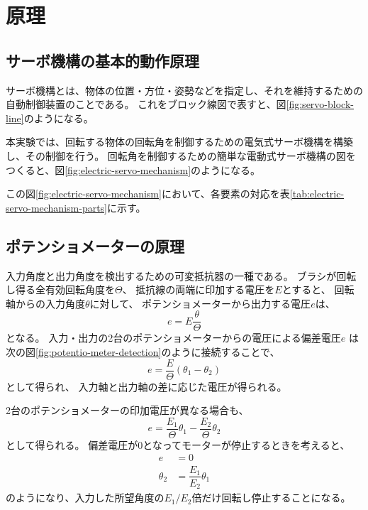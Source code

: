 \documentclass[../../../main]{subfiles}
\begin{document}
\section{原理}\label{sec:principle}

\subsection{サーボ機構の基本的動作原理}

サーボ機構とは、物体の位置・方位・姿勢などを指定し、それを維持するための自動制御装置のことである。
これをブロック線図で表すと、図\ref{fig:servo-block-line}のようになる。

本実験では、回転する物体の回転角を制御するための電気式サーボ機構を構築し、その制御を行う。
回転角を制御するための簡単な電動式サーボ機構の図をつくると、図\ref{fig:electric-servo-mechanism}のようになる。

この図\ref{fig:electric-servo-mechanism}において、各要素の対応を表\ref{tab:electric-servo-mechanism-parts}に示す。



\subsection{ポテンショメーターの原理}
入力角度と出力角度を検出するための可変抵抗器の一種である。
ブラシが回転し得る全有効回転角度を$\Theta$、
抵抗線の両端に印加する電圧を$E$とすると、
回転軸からの入力角度$\theta$に対して、
ポテンショメーターから出力する電圧$e$は、
\begin{equation}\label{eq:potentiometer}
    e = E \frac{\theta}{\Theta}
\end{equation}
となる。
入力・出力の2台のポテンショメーターからの電圧による偏差電圧$e$
は次の図\ref{fig:potentio-meter-detection}のように接続することで、
\begin{equation}
    e = \dfrac{E}{\Theta} (\theta_1 - \theta_2)
\end{equation}
として得られ、
入力軸と出力軸の差に応じた電圧が得られる。


2台のポテンショメーターの印加電圧が異なる場合も、
\begin{equation}
    e = \dfrac{E_1}{\Theta} \theta_1 - \dfrac{E_2}{\Theta} \theta_2
\end{equation}
として得られる。
偏差電圧が0となってモーターが停止するときを考えると、
\begin{align*}
    e        & = 0                         \\
    \theta_2 & = \dfrac{E_1}{E_2} \theta_1
\end{align*}
のようになり、入力した所望角度の$E_1/E_2$倍だけ回転し停止することになる。
\end{document}
